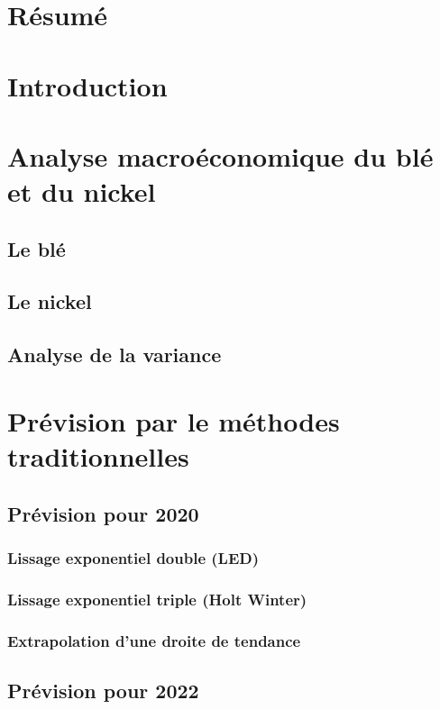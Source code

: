 \documentclass[11pt,a4paper]{article}
\begin{document}
\clearpage
{}
\section*{Résumé}
\setcounter{tocdepth}{6}
\renewcommand\contentsname{Sommaire}
\tableofcontents
\pagestyle{fancy}
\fancyhead{}\fancyfoot{}

\section*{Introduction}
\section{Analyse macroéconomique du blé et du nickel}
\subsection{Le blé}
\subsection{Le nickel}



\subsection{Analyse de la variance}

\section{Prévision par le méthodes traditionnelles}
\subsection{Prévision pour 2020}
\subsubsection{Lissage exponentiel double (LED)}
\subsubsection{Lissage exponentiel triple (Holt Winter)}
\subsubsection{Extrapolation d'une droite de tendance}
\subsection{Prévision pour 2022}
\end{document}
